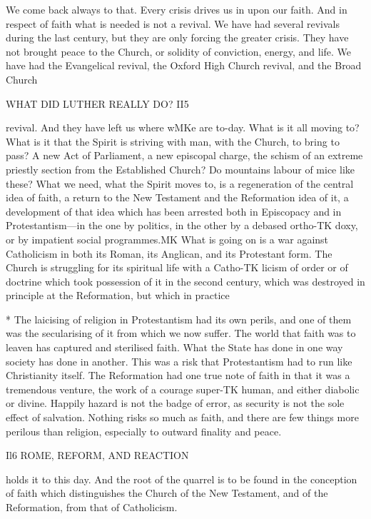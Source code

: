 \documentclass[12pt,a5paper,twoside]{book}
\begin{document}
We come back always to that. Every crisis drives 
us in upon our faith. And in respect of faith what 
is needed is not a revival. We have had several 
revivals during the last century, but they are only 
forcing the greater crisis. They have not brought 
peace to the Church, or solidity of conviction, energy, 
and life. We have had the Evangelical revival, the 
Oxford High Church revival, and the Broad Church 



WHAT DID LUTHER REALLY DO? II5 

revival. And they have left us where wMKe are to-day. 
What is it all moving to? What is it that the Spirit 
is striving with man, with the Church, to bring to 
pass? A new Act of Parliament, a new episcopal 
charge, the schism of an extreme priestly section from 
the Established Church? Do mountains labour of 
mice like these? What we need, what the Spirit 
moves to, is a regeneration of the central idea of faith, 
a return to the New Testament and the Reformation 
idea of it, a development of that idea which has been 
arrested both in Episcopacy and in Protestantism---in 
the one by politics, in the other by a debased ortho-TK
doxy, or by impatient social programmes.MK What is 
going on is a war against Catholicism in both its 
Roman, its Anglican, and its Protestant form. The 
Church is struggling for its spiritual life with a Catho-TK
licism of order or of doctrine which took possession 
of it in the second century, which was destroyed in 
principle at the Reformation, but which in practice 

* The laicising of religion in Protestantism had its own perils, 
and one of them was the secularising of it from which we now 
suffer. The world that faith was to leaven has captured and 
sterilised faith. What the State has done in one way society has 
done in another. This was a risk that Protestantism had to run like 
Christianity itself. The Reformation had one true note of faith in 
that it was a tremendous venture, the work of a courage super-TK
human, and either diabolic or divine. Happily hazard is not the 
badge of error, as security is not the sole effect of salvation. Nothing 
risks so much as faith, and there are few things more perilous than 
religion, especially to outward finality and peace. 



Il6 ROME, REFORM, AND REACTION 

holds it to this day. And the root of the quarrel is to 
be found in the conception of faith which distinguishes 
the Church of the New Testament, and of the 
Reformation, from that of Catholicism. 
\end{document}
